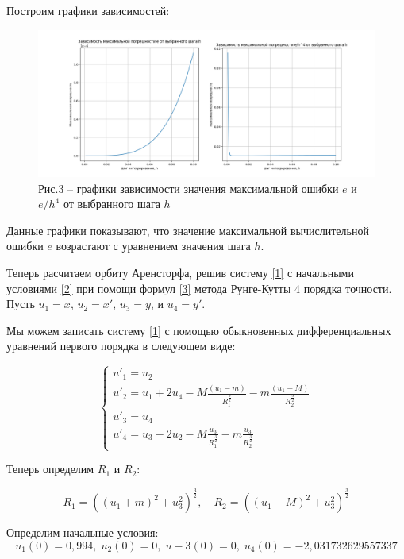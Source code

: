 \documentclass[a4paper,12pt]{article}
\begin{document}
{Построим графики зависимостей:
\begin{figure}[ht]
	\centering
	\includegraphics[width=\textwidth]{plot_max_err.png}
	\caption*{{\small Рис.3 -- графики зависимости значения максимальной ошибки $e$ и $e/h^4$ от выбранного шага $h$}}
\end{figure}
Данные графики показывают, что значение макси\-мальной вычислительной ошибки $e$ возрастают с уравнением значения шага $h$.

Теперь расчитаем орбиту Аренсторфа, решив систему \eqref{1} с начальными условиями \eqref{2} при помощи формул \eqref{3} метода Рунге-Кутты 4 порядка точности.
Пусть \( u_1 = x \), \( u_2 = x' \), \( u_3 = y \), и \( u_4 = y' \).

Мы можем записать систему \eqref{1} с помощью обыкновенных дифференциальных урав\-не\-ний первого порядка в следующем виде:

\begin{equation}
	\begin{cases}
	u'_1 = u_2 \\
	u'_2 = u_1 + 2u_4 - M\frac{(u_1 - m)}{R_1^{\frac{3}{2}}} - m\frac{(u_1 - M)}{R_2^{\frac{3}{2}}} \\
	u'_3 = u_4 \\
	u'_4 = u_3 - 2u_2 - M\frac{u_3}{R_1^{\frac{3}{2}}} - m\frac{u_3}{R_2^{\frac{3}{2}}}
	\end{cases}
	\label{5}
\end{equation}

Теперь определим \( R_1 \) и \( R_2 \):

\[
R_1 = \left((u_1 + m)^2 + u_3^2\right)^{\frac{3}{2}}, \quad R_2 = \left((u_1 - M)^2 + u_3^2\right)^{\frac{3}{2}}
\]

Определим начальные условия:
\begin{equation*}
	u_1(0) = 0,994,\;u_2(0) = 0,\;u-3(0) = 0,\;u_4(0) = -2,031732629557337
\end{equation*}

}
\end{document}
